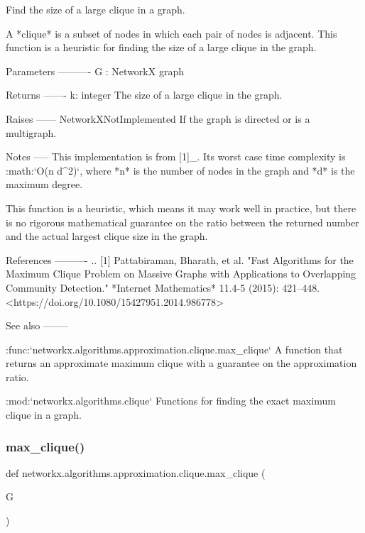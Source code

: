 \begin{DoxyVerb}Find the size of a large clique in a graph.

A *clique* is a subset of nodes in which each pair of nodes is
adjacent. This function is a heuristic for finding the size of a
large clique in the graph.

Parameters
----------
G : NetworkX graph

Returns
-------
k: integer
   The size of a large clique in the graph.

Raises
------
NetworkXNotImplemented
    If the graph is directed or is a multigraph.

Notes
-----
This implementation is from [1]_. Its worst case time complexity is
:math:`O(n d^2)`, where *n* is the number of nodes in the graph and
*d* is the maximum degree.

This function is a heuristic, which means it may work well in
practice, but there is no rigorous mathematical guarantee on the
ratio between the returned number and the actual largest clique size
in the graph.

References
----------
.. [1] Pattabiraman, Bharath, et al.
   "Fast Algorithms for the Maximum Clique Problem on Massive Graphs
   with Applications to Overlapping Community Detection."
   *Internet Mathematics* 11.4-5 (2015): 421--448.
   <https://doi.org/10.1080/15427951.2014.986778>

See also
--------

:func:`networkx.algorithms.approximation.clique.max_clique`
    A function that returns an approximate maximum clique with a
    guarantee on the approximation ratio.

:mod:`networkx.algorithms.clique`
    Functions for finding the exact maximum clique in a graph.\end{DoxyVerb}
 \mbox{\label{namespacenetworkx_1_1algorithms_1_1approximation_1_1clique_aa80ba180313409cdcfaeea9e076d6e26}} 
\subsubsection{\texorpdfstring{max\+\_\+clique()}{max\_clique()}}
{\footnotesize\ttfamily def networkx.\+algorithms.\+approximation.\+clique.\+max\+\_\+clique (\begin{DoxyParamCaption}\item[{}]{G }\end{DoxyParamCaption})}

